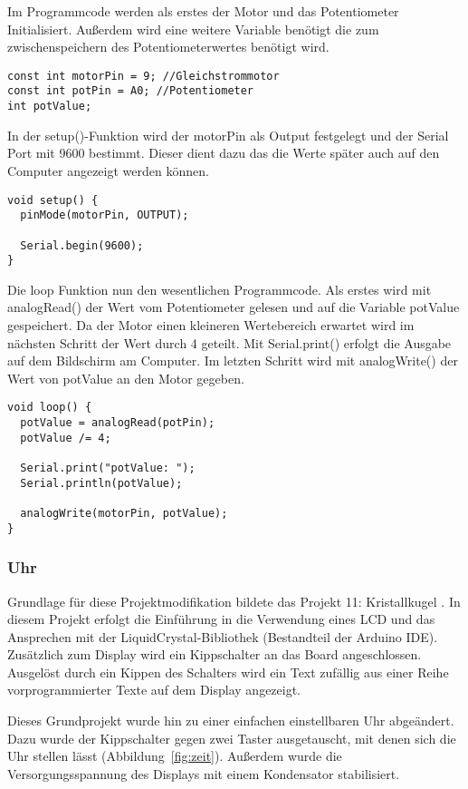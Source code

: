 Im Programmcode werden als erstes der Motor und das Potentiometer Initialisiert. Außerdem wird eine weitere Variable benötigt die zum zwischenspeichern des Potentiometerwertes benötigt wird.
\begin{lstlisting}[language=Arduino]
const int motorPin = 9; //Gleichstrommotor
const int potPin = A0; //Potentiometer
int potValue;
\end{lstlisting}

In der setup()-Funktion wird der motorPin als Output festgelegt und der Serial Port mit 9600 bestimmt. Dieser dient dazu das die Werte später auch auf den Computer angezeigt werden können.
\begin{lstlisting}[language=Arduino]
void setup() {
  pinMode(motorPin, OUTPUT);

  Serial.begin(9600);
}
\end{lstlisting}

Die loop Funktion nun den wesentlichen Programmcode. Als erstes wird mit analogRead() der Wert vom Potentiometer gelesen und auf die Variable potValue gespeichert. Da der Motor einen kleineren Wertebereich erwartet wird im nächsten Schritt der Wert durch 4 geteilt. Mit Serial.print() erfolgt die Ausgabe auf dem Bildschirm am Computer. Im letzten Schritt wird mit analogWrite() der Wert von potValue an den Motor gegeben.
\begin{lstlisting}[language=Arduino]
void loop() {
  potValue = analogRead(potPin);
  potValue /= 4;

  Serial.print("potValue: ");
  Serial.println(potValue);

  analogWrite(motorPin, potValue);
}
\end{lstlisting}



\subsubsection{Uhr}
Grundlage für diese Projektmodifikation bildete das Projekt 11: Kristallkugel \autocite{arduino}. In diesem Projekt erfolgt die Einführung in die Verwendung eines LCD und das Ansprechen mit der LiquidCrystal-Bibliothek (Bestandteil der Arduino IDE).
Zusätzlich zum Display wird ein Kippschalter an das Board angeschlossen. Ausgelöst durch ein Kippen des Schalters wird ein Text zufällig aus einer Reihe vorprogrammierter Texte auf dem Display angezeigt.

Dieses Grundprojekt wurde hin zu einer einfachen einstellbaren Uhr abgeändert. Dazu wurde der Kippschalter gegen zwei Taster ausgetauscht, mit denen sich die Uhr stellen lässt (Abbildung~\ref{fig:zeit}). Außerdem wurde die Versorgungsspannung des Displays mit einem Kondensator stabilisiert.

